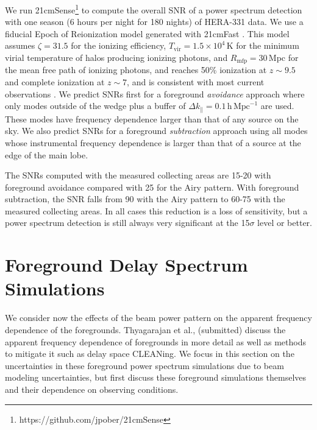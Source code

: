 \documentclass{emulateapj}
\begin{document}
We run 21cmSense\footnote{https://github.com/jpober/21cmSense} to compute the overall SNR of a power spectrum detection with one season (6 hours per night for 180 nights) of HERA-331 data. We use a fiducial Epoch of Reionization model generated with 21cmFast \citep{21cmfast}. This model assumes $\zeta=31.5$ for the ionizing efficiency, $T_\mathrm{vir}=1.5\times10^4$\,K for the minimum virial temperature of halos producing ionizing photons, and $R_\text{mfp}=30$\,Mpc for the mean free path of ionizing photons, and reaches 50\% ionization at $z \sim 9.5$ and complete ionization at $z \sim 7$, and is consistent with most current observations \citep[e.g.][]{PoberNextGen}. We predict SNRs first for a foreground \textit{avoidance} approach where only modes outside of the wedge plus a buffer of $\Delta k_\parallel=0.1\,\mathrm{h}\,\mathrm{Mpc}^{-1}$ are used. These modes have frequency dependence larger than that of any source on the sky. We also predict SNRs for a foreground \textit{subtraction} approach using all modes whose instrumental frequency dependence is larger than that of a source at the edge of the main lobe. 

The SNRs computed with the measured collecting areas are 15-20 with foreground avoidance compared with 25 for the Airy pattern. With foreground subtraction, the SNR falls from 90 with the Airy pattern to 60-75 with the measured collecting areas. In all cases this reduction is a loss of sensitivity, but a power spectrum detection is still always very significant at the 15$\sigma$ level or better.

\section{Foreground Delay Spectrum Simulations}
\label{sec:foregrounds}

We consider now the effects of the beam power pattern on the apparent frequency dependence of the foregrounds. Thyagarajan et al., (submitted) discuss the apparent frequency dependence of foregrounds in more detail as well as methods to mitigate it such as delay space CLEANing. We focus in this section on the uncertainties in these foreground power spectrum simulations due to beam modeling uncertainties, but first discuss these foreground simulations themselves and their dependence on observing conditions. 
\end{document}
